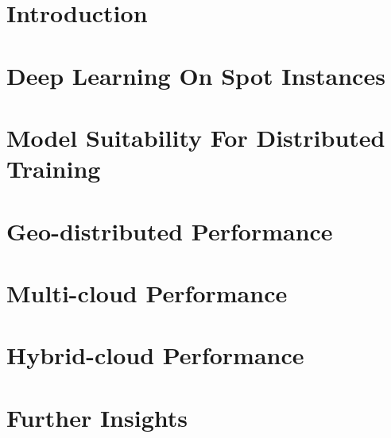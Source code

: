 \documentclass[sigconf, nonacm, table]{acmart}
\begin{document}
\section{Introduction}
\label{sec:introduction}


\section{Deep Learning On Spot Instances}
\label{sec:distributed-dl}


\section{Model Suitability For Distributed Training} 
\label{sec:model-suitability}


\section{Geo-distributed Performance}
\label{sec:geodistributed-performance} 


\section{Multi-cloud Performance}
\label{sec:multicloud-performance}

 
\section{Hybrid-cloud Performance}
\label{sec:hybrid-cloud-performance}


\vspace*{-2mm}
\section{Further Insights}
\label{sec:further-insights}

\end{document}
